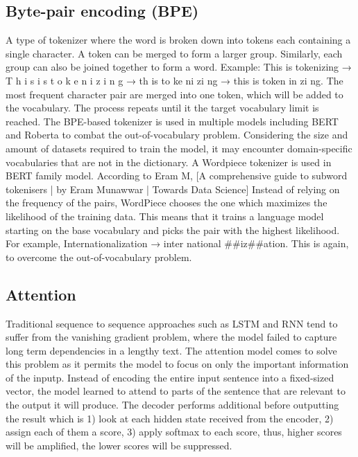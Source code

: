 \documentclass[12pt,oneside,openright,a4paper]{cpe-english-project}
\begin{document}
\subsection{Byte-pair encoding (BPE)}
A type of tokenizer where the word is broken down into tokens each containing a single character. A token can be merged to form a larger group. Similarly, each group can also be joined together to form a word. Example: This is tokenizing → T h i s i s t o k e n i z i n g → th is to ke ni zi ng → this is token in zi ng. The most frequent character pair are merged into one token, which will be added to the vocabulary.  The process repeats until it the target vocabulary limit is reached.
The BPE-based tokenizer is used in multiple models including BERT and Roberta to combat the out-of-vocabulary problem. Considering the size and amount of datasets required to train the model, it  may encounter domain-specific vocabularies that are not in the dictionary.
A Wordpiece tokenizer is used in BERT family model. According to Eram M, [A comprehensive guide to subword tokenisers | by Eram Munawwar | Towards Data Science] Instead of relying on the frequency of the pairs, WordPiece chooses the one which maximizes the likelihood of the training data. This means that it trains a language model starting on the base vocabulary and picks the pair with the highest likelihood. For example, Internationalization
→ inter national \#\#iz\#\#ation. This is again, to overcome the out-of-vocabulary problem.




\subsection{Attention}
Traditional sequence to sequence approaches such as LSTM and RNN tend to suffer from the vanishing gradient problem, where the model failed to capture long term dependencies in a lengthy text. The attention model comes to solve this problem as it permits the model to focus on only the important information of the inputp\cite{p}. Instead of encoding the entire input sentence into a fixed-sized vector, the model learned to attend to parts of the sentence that are relevant to the output it will produce.  The decoder performs additional before outputting the result which is 1) look at each hidden state received from the encoder, 2) assign each of them a score, 3) apply softmax to each score, thus, higher scores will be amplified, the lower scores will be suppressed.
\end{document}
